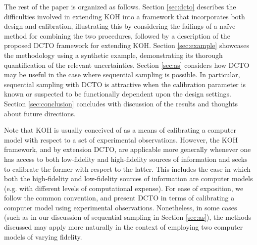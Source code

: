 \documentclass[12pt]{article}
\begin{document}
%
The rest of the paper is organized as follows.
%
Section \ref{sec:dcto} describes the difficulties involved in extending KOH into a framework that incorporates both design and calibration, illustrating this by considering the failings of a na\"ive method for combining the two procedures, followed by a description of the proposed DCTO framework for extending KOH.
%
Section \ref{sec:example} showcases the methodology using a synthetic example, demonstrating its thorough quantification of the relevant uncertainties.
%
Section \ref{sec:as} considers how DCTO may be useful in the case where sequential sampling is possible.
%
In particular, sequential sampling with DCTO is attractive when the calibration parameter is known or suspected to be functionally dependent upon the design settings.
%
Section \ref{sec:conclusion} concludes with discussion of the results and thoughts about future directions.
%

%
Note that KOH is usually conceived of as a means of calibrating a computer model with respect to a set of experimental observations.
%
However, the KOH framework, and by extension DCTO, are applicable more generally whenever one has access to both low-fidelity and high-fidelity sources of information and seeks to calibrate the former with respect to the latter.
%
This includes the case in which both the high-fidelity and low-fidelity sources of information are computer models (e.g. with different levels of computational expense).
%
For ease of exposition, we follow the common convention, and present DCTO in terms of calibrating a computer model using experimental observations.
%
Nonetheless, in some cases (such as in our discussion of sequential sampling in Section \ref{sec:as}), the methods discussed may apply more naturally in the context of employing two computer models of varying fidelity.
%

%
\end{document}
